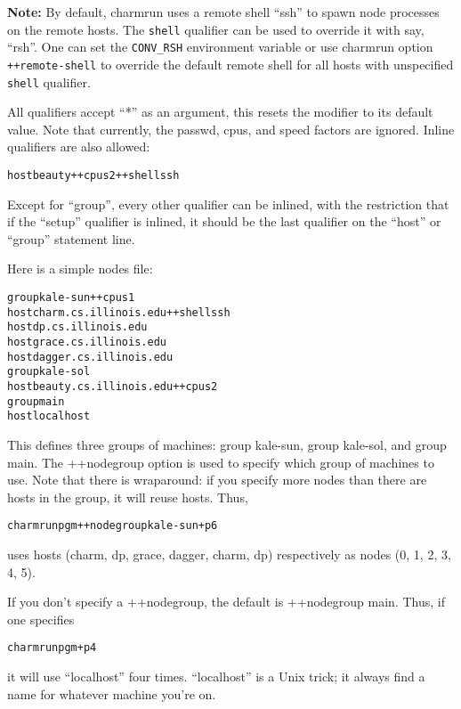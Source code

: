 {\bf Note:}
By default, charmrun uses a remote shell ``ssh'' to spawn node processes
on the remote hosts. The {\tt shell} qualifier can be used to override
it with say, ``rsh''. One can set the {\tt CONV\_RSH} environment variable
or use charmrun option {\tt ++remote-shell} to override the default remote
shell for all hosts with unspecified {\tt shell} qualifier.

All qualifiers accept ``*'' as an argument, this resets the modifier to
its default value.  Note that currently, the passwd, cpus, and speed
factors are ignored.  Inline qualifiers are also allowed:

\begin{alltt}
host beauty ++cpus 2 ++shell ssh
\end{alltt}

Except for ``group'', every other qualifier can be inlined, with the
restriction that if the ``setup'' qualifier is inlined, it should be
the last qualifier on the ``host'' or ``group'' statement line.

Here is a simple nodes file:

\begin{alltt}
        group kale-sun ++cpus 1
          host charm.cs.illinois.edu ++shell ssh
          host dp.cs.illinois.edu
          host grace.cs.illinois.edu
          host dagger.cs.illinois.edu
        group kale-sol
          host beauty.cs.illinois.edu ++cpus 2
        group main
          host localhost
\end{alltt}

This defines three groups of machines: group kale-sun, group kale-sol,
and group main.  The ++nodegroup option is used to specify which group
of machines to use.  Note that there is wraparound: if you specify
more nodes than there are hosts in the group, it will reuse
hosts. Thus,

\begin{alltt}
        charmrun pgm ++nodegroup kale-sun +p6
\end{alltt}

uses hosts (charm, dp, grace, dagger, charm, dp) respectively as
nodes (0, 1, 2, 3, 4, 5).

If you don't specify a ++nodegroup, the default is ++nodegroup main.
Thus, if one specifies

\begin{alltt}
        charmrun pgm +p4
\end{alltt}

it will use ``localhost'' four times.  ``localhost'' is a Unix
trick; it always find a name for whatever machine you're on.

